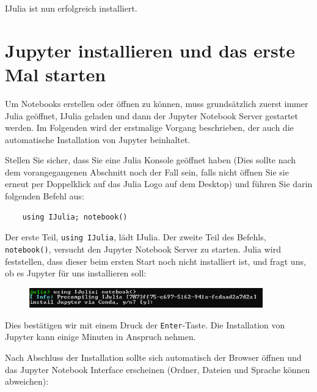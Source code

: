 \documentclass[11pt, a4paper]{scrartcl}
\begin{document}
	IJulia ist nun erfolgreich installiert.
	
	
	
	
	
	
	
	
	
	
	
	
	
	\section{Jupyter installieren und das erste Mal starten}
	
	Um Notebooks erstellen oder öffnen zu können, muss grundsätzlich zuerst immer Julia geöffnet, IJulia geladen und dann der Jupyter Notebook Server gestartet werden. Im Folgenden wird der erstmalige Vorgang beschrieben, der auch die automatische Installation von Jupyter beinhaltet. 
	
	Stellen Sie sicher, dass Sie eine Julia Konsole geöffnet haben (Dies sollte nach dem vorangegangenen Abschnitt noch der Fall sein, falls nicht öffnen Sie sie erneut per Doppelklick auf das Julia Logo auf dem Desktop) und führen Sie darin folgenden Befehl aus:
	
	\begin{lstlisting}
	using IJulia; notebook()
	\end{lstlisting}
	
	Der erste Teil, \texttt{using IJulia}, lädt IJulia. Der zweite Teil des Befehls, \texttt{notebook()}, versucht den Jupyter Notebook Server zu starten. Julia wird feststellen, dass dieser beim ersten Start noch nicht installiert ist, und fragt uns, ob es Jupyter für uns installieren soll:
	
	\begin{figure}[h!]
	\centering
	\includegraphics[width=0.9\textwidth]{imgs/Jupyter_install.png}
	\end{figure}
	
	Dies bestätigen wir mit einem Druck der \texttt{Enter}-Taste. Die Installation von Jupyter kann einige Minuten in Anspruch nehmen.
	
	Nach Abschluss der Installation sollte sich automatisch der Browser öffnen und das Jupyter Notebook Interface erscheinen (Ordner, Dateien und Sprache können abweichen):
	
\end{document}
